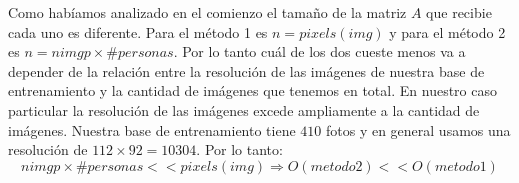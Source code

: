 Como habíamos analizado en el comienzo el tamaño de la matriz $A$ que recibie cada uno es diferente. Para el método 1 es $n = pixels(img)$ y
para el método 2 es $n = nimgp \times \#personas$. Por lo tanto cuál de los dos cueste menos va a depender de la relación entre la resolución
de las imágenes de nuestra base de entrenamiento y la cantidad de imágenes que tenemos en total. En nuestro caso particular la resolución de las
imágenes excede ampliamente a la cantidad de imágenes. Nuestra base de entrenamiento tiene $410$ fotos y en general usamos una resolución
de $112 \times 92 = 10304$. Por lo tanto: 
\begin{displaymath}
 nimgp \times \#personas << pixels(img) \Rightarrow O(metodo2) << O(metodo1)
\end{displaymath}





